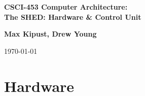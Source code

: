 \documentclass{report}
\newcommand{\hmwkTitle}{The SHED: Hardware \& Control Unit}
\newcommand{\hmwkClass}{CSCI-453 Computer Architecture}
\newcommand{\hmwkAuthorName}{\textbf{Max Kipust, Drew Young}}
\begin{document}
\begin{titlepage}
	\renewcommand*{\thepage}{Title}

	\begin{center}
		\vspace{2in}
		\textmd{\textbf{\Huge \hmwkClass:\\ \hmwkTitle}}\\
		\vspace{3in}

		\hmwkAuthorName

		\vfill

		{\large \today}
	\end{center}
\end{titlepage}

\chapter{Hardware}
\end{document}
